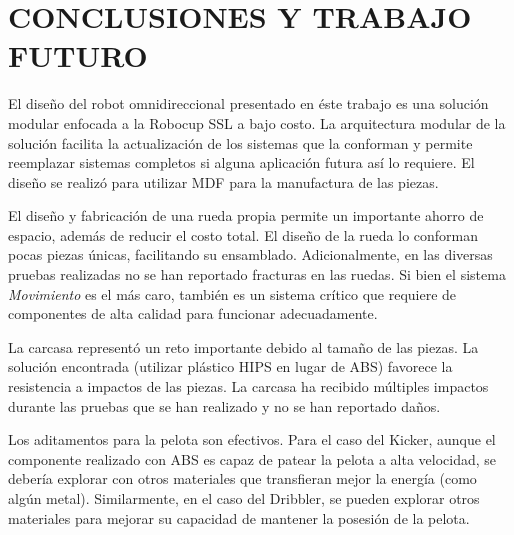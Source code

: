 \chapter{CONCLUSIONES Y TRABAJO FUTURO}
\label{ch:conclusiones}






El diseño del robot omnidireccional presentado en éste trabajo es una solución modular enfocada a la Robocup \gls{SSL} a bajo costo. La arquitectura modular de la solución facilita la actualización de los sistemas que la conforman y permite reemplazar sistemas completos si alguna aplicación futura así lo requiere.
El diseño se realizó para utilizar \gls{MDF} para la manufactura de las piezas.

El diseño y fabricación de una rueda propia permite un importante ahorro de espacio, además de reducir el costo total. El diseño de la rueda lo conforman pocas piezas únicas, facilitando su ensamblado. Adicionalmente, en las diversas pruebas realizadas no se han reportado fracturas en las ruedas. Si bien el sistema \textit{Movimiento} es el más caro, también es un sistema crítico que requiere de componentes de alta calidad para funcionar adecuadamente. 


La carcasa representó un reto importante debido al tamaño de las piezas. La solución encontrada (utilizar plástico \gls{HIPS} en lugar de \gls{ABS}) favorece la resistencia a impactos de las piezas. La carcasa ha recibido múltiples impactos durante las pruebas que se han realizado y no se han reportado daños.


Los aditamentos para la pelota son efectivos. Para el caso del \gls{Kicker}, aunque el componente realizado con \gls{ABS} es capaz de patear la pelota a alta velocidad, se debería explorar con otros materiales que transfieran mejor la energía (como algún metal). Similarmente, en el caso del \gls{Dribbler}, se pueden explorar otros materiales para mejorar su capacidad de mantener la posesión de la pelota.


